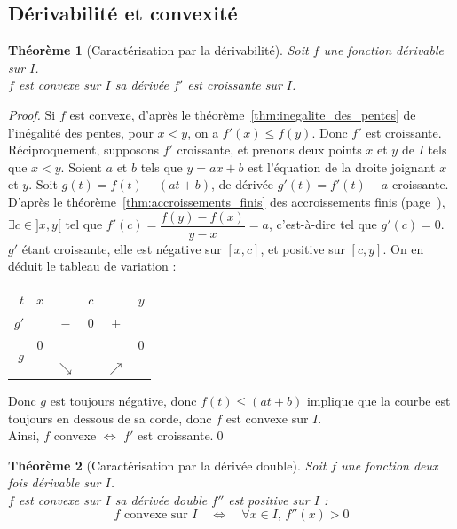 \documentclass[11pt,a4paper]{report}
\newtheorem{theorem}{Théorème}[chapter]
\theoremstyle{definition}
\begin{document}
\subsection{Dérivabilité et convexité} %
\label{sub:derivabilite_et_convexite}
\begin{theorem}[Caractérisation par la dérivabilité]
     Soit $f$ une fonction dérivable sur $I$. \\
     $f$ est convexe sur $I$ \Longleftrightarrow sa dérivée $f'$ est croissante sur $I$.
\end{theorem}
\begin{proof}
     Si $f$ est convexe, d'après le théorème~\ref{thm:inegalite_des_pentes} de l'inégalité des pentes, pour $x < y$, on a $f'(x) \le f(y)$. Donc $f'$ est croissante. \\[0.7\baselineskip]
     Réciproquement, supposons $f'$ croissante, et prenons deux points $x$ et $y$ de $I$ tels que $x < y$. Soient $a$ et $b$ tels que $y = ax + b$ est l'équation de la droite joignant $x$ et $y$. Soit $g(t) = f(t) - (at + b)$, de dérivée $g'(t) = f'(t) -a$ croissante. D'après le théorème~\ref{thm:accroissements_finis} des accroissements finis (page~\pageref{thm:accroissements_finis}), $\exists c\in ]x,y[$ tel que $f'(c) = \dfrac{f(y) - f(x)}{y-x} = a$, c'est-à-dire tel que $g'(c) = 0$. $g'$ étant croissante, elle est négative sur $[x,c]$, et positive sur $[c,y]$. On en déduit le tableau de variation : 
     \begin{center}
     \begin{tabular}{r | c c c c c}
          $t$ & $x$ & & $c$ & & $y$ \\
          \hline
          $g'$& & $-$ & $0$ & $+$ & \\
          \hline
          \multirow{2}{*}{$g$}& $0$ &&&& $0$ \\
                                 &   & $\searrow$ & & $\nearrow$ & 
     \end{tabular}
     \end{center}
     Donc $g$ est toujours négative, donc $f(t) \le (at + b)$ implique que la courbe est toujours en dessous de sa corde, donc $f$ est convexe sur $I$.\\[\baselineskip]
     Ainsi, $f$ convexe $\Longleftrightarrow$ $f'$ est croissante.\qed
\end{proof}
\begin{theorem}[Caractérisation par la dérivée double]
     Soit $f$ une fonction deux fois dérivable sur $I$. \\
     $f$ est convexe sur $I$ \Longleftrightarrow sa dérivée double $f''$ est positive sur $I$ : 
     \begin{equation}
     f\text{ convexe sur }I\quad \Longleftrightarrow \quad \forall x\in I,\, f''(x)>0
     \end{equation}
\end{theorem}
\end{document}
